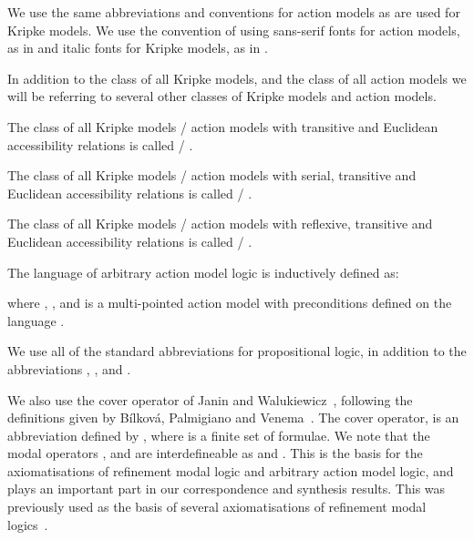 \documentclass[twoside]{aiml14}
\begin{document}
  We use the same abbreviations and conventions for action models as are used
  for Kripke models. We use the convention of using sans-serif fonts for action
  models, as in \pointedActionModel{\actionStatesT} and italic fonts for Kripke
  models, as in \pointedModel{\statesT}.

  In addition to the class \classK{} of all Kripke models, 
  and the class \classAM{} of all action models 
  we will be referring to several other classes of Kripke models and action models.

  \begin{definition}
      The class of all Kripke models / action models with transitive and Euclidean accessibility relations is called \classKFF{} / .

      The class of all Kripke models / action models with serial, transitive and Euclidean accessibility relations is called \classKD{} / .

      The class of all Kripke models / action models with reflexive, transitive and Euclidean accessibility relations is called \classS{} / .
  \end{definition}

  \begin{definition}\label{aml-syntax}
  The language \langAaml{} of arbitrary action model logic is inductively defined as:
  
  where , , and
   is a multi-pointed action
  model with preconditions defined on the language \langAaml{}.
  \end{definition}

  We use all of the standard abbreviations for propositional logic, in addition
  to the abbreviations 
  ,
  ,
  and .

  We also use the cover operator of Janin and Walukiewicz~\cite{janin1995},
  following the definitions given by B{\'i}lkov{\'a}, Palmigiano and
  Venema~\cite{bilkova2008}.  The cover operator,  is
  an abbreviation defined by ,
  where  is a finite set of formulae.
  We note that the modal operators ,  and  are interdefineable
  as  and .
  This is the basis for the axiomatisations of refinement modal logic and
  arbitrary action model logic, and plays an important part in our correspondence
  and synthesis results.
  This was previously used as the basis of several axiomatisations
  of refinement modal logics~\cite{vanditmarsch2010,hales2011a,hales2011b,hales2012,bozzelli2012a,hales2013}.
\end{document}
